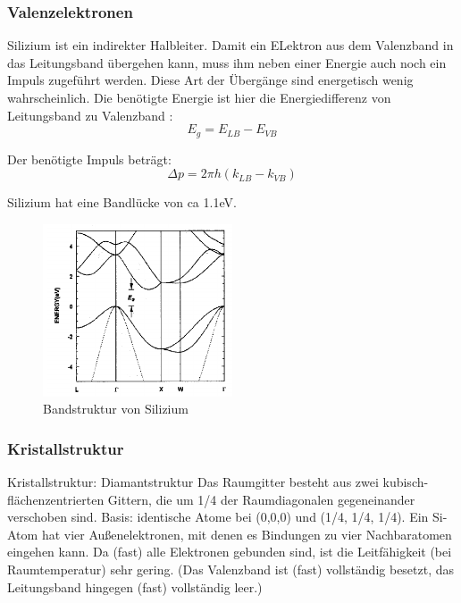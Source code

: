 		
	\subsubsection{Valenzelektronen}
		Silizium ist ein indirekter Halbleiter. Damit ein ELektron aus dem Valenzband in das Leitungsband übergehen kann, muss ihm neben einer Energie auch noch ein Impuls zugeführt werden. Diese Art der Übergänge sind energetisch wenig wahrscheinlich.
		Die benötigte Energie ist hier die Energiedifferenz von Leitungsband zu Valenzband :
		\begin{equation*}
		E_g = E_{LB} - E_{VB}
		\end{equation*}
		
		Der benötigte Impuls beträgt:
		\begin{equation*}
			\Delta p = 2\pi h(k_{LB}-k_{VB})
		\end{equation*}
		
		Silizium hat eine Bandlücke von ca 1.1eV.
		
		\begin{figure}[ht]
			\centering
			\includegraphics[width=0.5\textwidth]{Kapitel/Kap02/bandstruktur_SI.PNG}
			\caption{Bandstruktur von Silizium}
			\label{02_BS_SI}
		\end{figure}
		
	
	\subsubsection{Kristallstruktur}
		
		Kristallstruktur: Diamantstruktur
		Das Raumgitter besteht aus zwei kubisch-flächenzentrierten Gittern, die um 1/4 der Raumdiagonalen gegeneinander verschoben sind.
		Basis: identische Atome bei (0,0,0) und (1/4, 1/4, 1/4).
		Ein Si-Atom hat vier Außenelektronen, mit denen es Bindungen zu vier Nachbaratomen eingehen kann. Da (fast) alle Elektronen gebunden sind, ist die Leitfähigkeit (bei Raumtemperatur) sehr gering. (Das Valenzband ist (fast) vollständig besetzt, das Leitungsband hingegen (fast) vollständig leer.)
		
